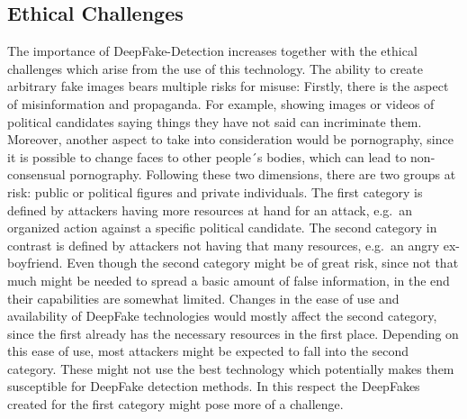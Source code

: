 \subsection{Ethical Challenges}
The importance of DeepFake-Detection increases together with the ethical
challenges which arise from the use of this technology. The ability to create
arbitrary fake images bears multiple risks for misuse: Firstly, there is the
aspect of misinformation and propaganda. For example, showing images or videos
of political candidates saying things they have not said can incriminate
them. Moreover, another aspect to take into consideration would be pornography,
since it is possible to change faces to other people´s bodies, which can lead to
non-consensual pornography. Following these two dimensions, there are two groups
at risk: public or political figures and private individuals. The first category
is defined by attackers having more resources at hand for an attack, e.g.\ an
organized action against a specific political candidate. The second category in 
contrast is defined by attackers not having that many resources, e.g.\ an angry 
ex-boyfriend. Even though the second category might be of great risk, since not 
that much might be needed to spread a basic amount of false information, in the 
end their capabilities are somewhat limited. Changes in the ease of use and 
availability of DeepFake technologies would mostly affect the second category, 
since the first already has the necessary resources in the first place. Depending 
on this ease of use, most attackers might be expected to fall into the second 
category. These might not use the best technology which potentially makes them 
susceptible for DeepFake detection methods. In this respect the DeepFakes created
for the first category might pose more of a challenge.
 